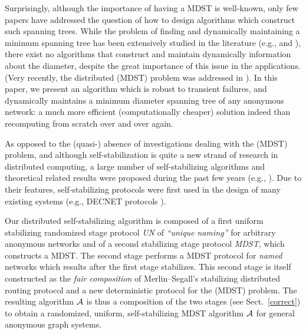 \documentclass[10pt]{article}
\begin{document}
Surprisingly, although the importance of having a MDST is well-known,
only few papers have addressed the question of how to design
algorithms which construct such spanning trees.  While the problem of
finding and dynamically maintaining a minimum spanning tree has been
extensively studied in the literature (e.g., \cite{Awer87,GaHS83} and
\cite{AwCK90,EITT+92}), there exist no algorithms that
construct and maintain dynamically information about the diameter,
despite the great importance of this issue in the applications. (Very
recently, the distributed (MDST) problem was addressed in
\cite{BuBu93b,Lava95}). In this paper, we present an algorithm which
is robust to transient failures, and dynamically maintains a minimum
diameter spanning tree of any anonymous network: a much more efficient
(computationally cheaper) solution indeed than recomputing from
scratch over and over again.

As opposed to the (quasi-) absence of investigations dealing with the
(MDST) problem, and although self-stabilization is quite a new strand
of research in distributed computing, a large number of
self-stabilizing algorithms and theoretical related results were
proposed during the past few years (e.g.,
\cite{AfBr89,AnEH92,AKMP+93,APVD94,DoIM91a,DoIM91b,DoIM93,DoIM95b,KaPe93,ShRR95,Varg94}).  Due to their features,
self-stabilizing protocols were first used in the design of many
existing systems (e.g., DECNET protocols \cite {Perl83}).

Our distributed self-stabilizing algorithm is composed of a first
uniform stabilizing randomized stage protocol {\em UN} of {\em
``unique naming''} for arbitrary anonymous networks and of a second
stabilizing stage protocol {\em MDST}, which constructs a MDST. The
second stage performs a MDST protocol for {\em named} networks which
results after the first stage stabilizes.  This second stage is itself
constructed as the {\em fair composition}
\cite{DoIM93,DoIM95b,ShRR95} of Merlin--Segall's stabilizing
distributed routing protocol and a new deterministic
protocol for the (MDST) problem. The resulting algorithm $\cal A$ is
thus a composition of the two stages (see Sect.~\ref{correct})
to obtain a randomized, uniform, self-stabilizing MDST algorithm $\cal A$
for general anonymous graph systems.
\end{document}
